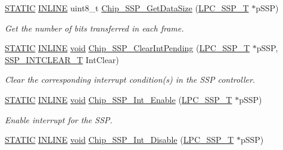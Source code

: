 \begin{DoxyCompactItemize}
\hyperlink{group__LPC__Types__Public__Macros_ga10b2d890d871e1489bb02b7e70d9bdfb}{S\-T\-A\-T\-I\-C} \hyperlink{group__LPC__Types__Public__Types_ga2eb6f9e0395b47b8d5e3eeae4fe0c116}{I\-N\-L\-I\-N\-E} uint8\-\_\-t \hyperlink{group__SSP__17XX__40XX_ga421d39f6094d0f335e5acbc3dd5f0b09}{Chip\-\_\-\-S\-S\-P\-\_\-\-Get\-Data\-Size} (\hyperlink{structLPC__SSP__T}{L\-P\-C\-\_\-\-S\-S\-P\-\_\-\-T} $\ast$p\-S\-S\-P)
\begin{DoxyCompactList}\small\item\em Get the number of bits transferred in each frame. \end{DoxyCompactList}\item 
\hyperlink{group__LPC__Types__Public__Macros_ga10b2d890d871e1489bb02b7e70d9bdfb}{S\-T\-A\-T\-I\-C} \hyperlink{group__LPC__Types__Public__Types_ga2eb6f9e0395b47b8d5e3eeae4fe0c116}{I\-N\-L\-I\-N\-E} \hyperlink{Paradigm_2Tern__EE_2small_2portmacro_8h_a14d32f8130d3c0b212cfc751730b5b49}{void} \hyperlink{group__SSP__17XX__40XX_ga5fe8047a36b3055251cff755d339ca4a}{Chip\-\_\-\-S\-S\-P\-\_\-\-Clear\-Int\-Pending} (\hyperlink{structLPC__SSP__T}{L\-P\-C\-\_\-\-S\-S\-P\-\_\-\-T} $\ast$p\-S\-S\-P, \hyperlink{group__SSP__17XX__40XX_gadc98b69a8cb7a5afef8dd81bebbfc66d}{S\-S\-P\-\_\-\-I\-N\-T\-C\-L\-E\-A\-R\-\_\-\-T} Int\-Clear)
\begin{DoxyCompactList}\small\item\em Clear the corresponding interrupt condition(s) in the S\-S\-P controller. \end{DoxyCompactList}\item 
\hyperlink{group__LPC__Types__Public__Macros_ga10b2d890d871e1489bb02b7e70d9bdfb}{S\-T\-A\-T\-I\-C} \hyperlink{group__LPC__Types__Public__Types_ga2eb6f9e0395b47b8d5e3eeae4fe0c116}{I\-N\-L\-I\-N\-E} \hyperlink{Paradigm_2Tern__EE_2small_2portmacro_8h_a14d32f8130d3c0b212cfc751730b5b49}{void} \hyperlink{group__SSP__17XX__40XX_ga98eb3a788e313aeb5a4feb2516b11e8f}{Chip\-\_\-\-S\-S\-P\-\_\-\-Int\-\_\-\-Enable} (\hyperlink{structLPC__SSP__T}{L\-P\-C\-\_\-\-S\-S\-P\-\_\-\-T} $\ast$p\-S\-S\-P)
\begin{DoxyCompactList}\small\item\em Enable interrupt for the S\-S\-P. \end{DoxyCompactList}\item 
\hyperlink{group__LPC__Types__Public__Macros_ga10b2d890d871e1489bb02b7e70d9bdfb}{S\-T\-A\-T\-I\-C} \hyperlink{group__LPC__Types__Public__Types_ga2eb6f9e0395b47b8d5e3eeae4fe0c116}{I\-N\-L\-I\-N\-E} \hyperlink{Paradigm_2Tern__EE_2small_2portmacro_8h_a14d32f8130d3c0b212cfc751730b5b49}{void} \hyperlink{group__SSP__17XX__40XX_ga20c7c516c84ba924973318bd64c113a3}{Chip\-\_\-\-S\-S\-P\-\_\-\-Int\-\_\-\-Disable} (\hyperlink{structLPC__SSP__T}{L\-P\-C\-\_\-\-S\-S\-P\-\_\-\-T} $\ast$p\-S\-S\-P)

\end{DoxyCompactItemize}
